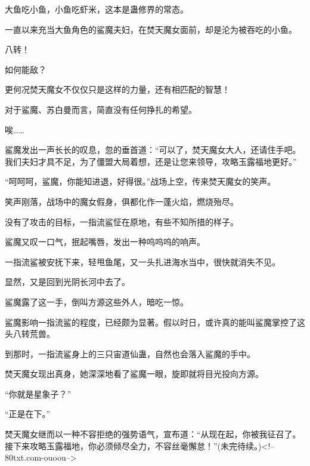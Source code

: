 \begin{this_body}
大鱼吃小鱼，小鱼吃虾米，这本是蛊修界的常态。

一直以来充当大鱼角色的鲨魔夫妇，在焚天魔女面前，却是沦为被吞吃的小鱼。

八转！

如何能敌？

更何况焚天魔女不仅仅只是这样的力量，还有相匹配的智慧！

对于鲨魔、苏白曼而言，简直没有任何挣扎的希望。

唉……

鲨魔发出一声长长的叹息，忽的垂首道：“可以了，焚天魔女大人，还请住手吧。我们夫妇才具不足，为了僵盟大局着想，还是让您来领导，攻略玉露福地更好。”

“呵呵呵，鲨魔，你能知进退，好得很。”战场上空，传来焚天魔女的笑声。

笑声刚落，战场中的魔女假身，俱都化作一蓬火焰，燃烧殆尽。

没有了攻击的目标，一指流鲨怔在原地，有些不知所措的样子。

鲨魔又叹一口气，抿起嘴唇，发出一种呜呜呜的响声。

一指流鲨被安抚下来，轻甩鱼尾，又一头扎进海水当中，很快就消失不见。

显然，又是回到光阴长河中去了。

鲨魔露了这一手，倒叫方源这些外人，暗吃一惊。

鲨魔影响一指流鲨的程度，已经颇为显著。假以时日，或许真的能叫鲨魔掌控了这头八转荒兽。

到那时，一指流鲨身上的三只宙道仙蛊，自然也会落入鲨魔的手中。

焚天魔女现出真身，她深深地看了鲨魔一眼，旋即就将目光投向方源。

“你就是星象子？”

“正是在下。”

焚天魔女继而以一种不容拒绝的强势语气，宣布道：“从现在起，你被我征召了。接下来攻略玉露福地，你必须倾尽全力，不容丝毫懈怠！”(未完待续。)<!--80txt.com-ouoou-->

\end{this_body}

